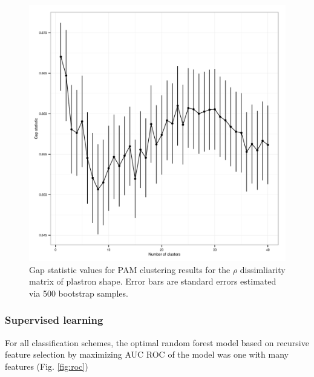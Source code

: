 \documentclass[12pt]{article}\usepackage{graphicx, color}
\begin{document}
\begin{figure}[ht]
  \centering
  \includegraphics[width = \textwidth]{figure/gap_res}
  \caption{Gap statistic values for PAM clustering results for the \(\rho\) dissimliarity matrix of plastron shape. Error bars are standard errors estimated via 500 bootstrap samples.}
  \label{fig:gap}
\end{figure}

\subsubsection{Supervised learning}
For all classification schemes, the optimal random forest model based on recursive feature selection by maximizing AUC ROC of the model was one with many features (Fig. \ref{fig:roc})
\end{document}
